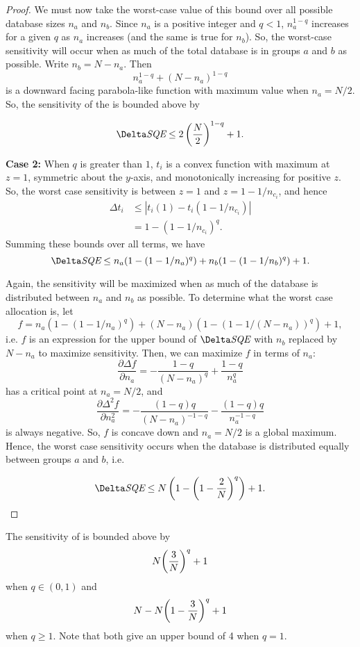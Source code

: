 \begin{proof}
We must now take the worst-case value of this bound over all possible database sizes $n_a$ and $n_b$.  Since $n_a$ is a positive integer and $q<1$, $n_a^{1-q}$ increases for a given $q$ as $n_a$ increases (and the same is true for $n_b$). So, the worst-case sensitivity will occur when as much of the total database is in groups $a$ and $b$ as possible. Write $n_b = N-n_a$. Then
$$n_a^{1-q} + (N-n_a)^{1-q}$$
is a downward facing parabola-like function with maximum value when $n_a = N/2$. So, the sensitivity of the \sqe is bounded above by

$$\Delta \sqe \le 2\left(\frac{N}{2}\right)^{1-q} + 1.$$

\noindent\textbf{Case 2:}
When $q$ is greater than $1$, $t_{i}$ is a convex function with maximum at $z=1$, symmetric about the $y$-axis, and monotonically increasing for positive $z$. So, the worst case sensitivity is between $z=1$ and $z=1-1/n_{c_i}$, and hence 
%
\begin{align*}
\Delta t_{i} &\le \left\vert t_{i}(1) - t_{i}(1-1/n_{c_i}) \right\vert \\
	&= 1 - (1-1/n_{c_i})^q.
\end{align*}
%
Summing these bounds over all terms, we have 
%
$$ \Delta\sqe \le n_a(1-(1-1/n_a)^q) + n_b(1-(1-1/n_b)^q) + 1.$$

Again, the sensitivity will be maximized when as much of the database is distributed between $n_a$ and $n_b$ as possible. To determine what the worst case allocation is, let 
$$f = n_a(1-(1-1/n_a)^q) + (N-n_a)(1-(1-1/(N-n_a))^q) + 1,$$
i.e. $f$ is an expression for the upper bound of $\Delta\sqe$ with $n_b$ replaced by $N-n_a$ to maximize sensitivity. Then, we can maximize $f$ in terms of $n_a$:
$$ \frac{\partial \Delta f}{\partial n_a} =  -\frac{1-q}{(N - n_a)^q} + \frac{1-q}{n_a^q}$$
has a critical point at $n_a = N/2$, and 
$$ \frac{\partial \Delta^2 f}{\partial n_a^2} = - \frac{(1-q)q}{(N-n_a)^{-1-q}} - \frac{(1-q)q}{n_a^{-1-q}}$$
is always negative. So, $f$ is concave down and $n_a = N/2$ is a global maximum. Hence, the worst case sensitivity occurs when the database is distributed equally between groups $a$ and $b$, i.e. 

$$ \Delta\sqe \le N \left( 1- \left(1-\frac{2}{N}\right)^q \right) + 1.$$
\end{proof}

\setcounter{theorem}{7}
\begin{theorem} \label{thm:SQAsens-appendix} The sensitivity of \sqa is bounded above by 
\begin{equation*}
N\bigg(\frac{3}{N}\bigg)^q + 1
\end{equation*}
when $q \in (0,1)$ and
\begin{equation*}
N-N\bigg(1-\frac{3}{N}\bigg)^q + 1
\end{equation*}
when $q \geq 1$. Note that both give an upper bound of 4 when $q = 1$.
\end{theorem}

